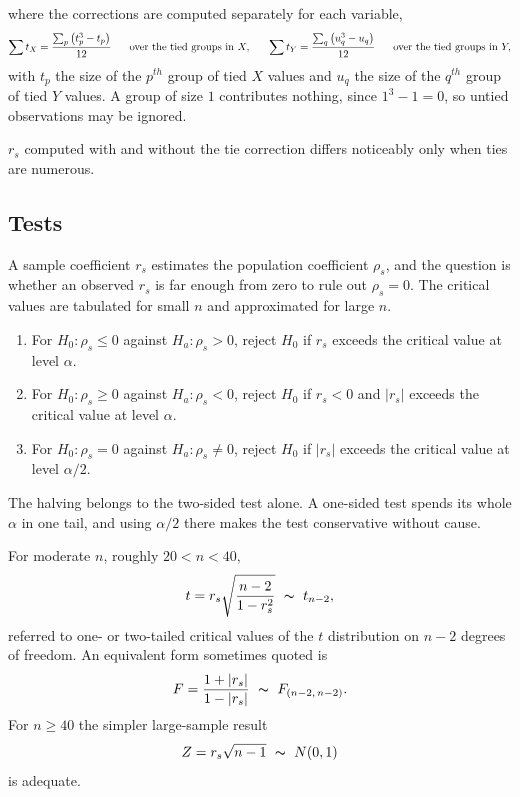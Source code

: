 \documentclass[11pt,a4paper]{article}
\theoremstyle{definition}
\begin{document}
where the corrections are computed separately for each variable,
$$\sum t_X=\dfrac{\sum_{p}\left(t_p^{3}-t_p\right)}{12}
\hspace{0.6cm}\text{over the tied groups in } X,
\hspace{0.6cm}
\sum t_Y=\dfrac{\sum_{q}\left(u_q^{3}-u_q\right)}{12}
\hspace{0.6cm}\text{over the tied groups in } Y,$$
with $t_p$ the size of the $p^{th}$ group of tied $X$ values and $u_q$ the size of
the $q^{th}$ group of tied $Y$ values. A group of size $1$ contributes nothing,
since $1^{3}-1=0$, so untied observations may be ignored.

$r_s$ computed with and without the tie correction differs noticeably only when
ties are numerous.


\subsection{Tests}
A sample coefficient $r_s$ estimates the population coefficient $\rho_s$, and the
question is whether an observed $r_s$ is far enough from zero to rule out
$\rho_s=0$. The critical values are tabulated for small $n$ and approximated for
large $n$.

\begin{enumerate}
\item[(i).] For $H_0:\rho_s\leq 0$ against $H_a:\rho_s>0$, reject $H_0$ if
$r_s$ exceeds the critical value at level $\alpha$.
\item[(ii).] For $H_0:\rho_s\geq 0$ against $H_a:\rho_s<0$, reject $H_0$ if
$r_s<0$ and $\left|r_s\right|$ exceeds the critical value at level $\alpha$.
\item[(iii).] For $H_0:\rho_s=0$ against $H_a:\rho_s\neq 0$, reject $H_0$ if
$\left|r_s\right|$ exceeds the critical value at level $\alpha/2$.
\end{enumerate}

The halving belongs to the two-sided test alone. A one-sided test spends its whole
$\alpha$ in one tail, and using $\alpha/2$ there makes the test conservative
without cause.

For moderate $n$, roughly $20<n<40$,
$$t=r_s\sqrt{\dfrac{n-2}{1-r_s^{2}}}\ \thicksim\ t_{n-2},$$
referred to one- or two-tailed critical values of the $t$ distribution on $n-2$
degrees of freedom. An equivalent form sometimes quoted is
$$F=\dfrac{1+\left|r_s\right|}{1-\left|r_s\right|}\ \thicksim\ F_{(n-2,\,n-2)} .$$
For $n\geq 40$ the simpler large-sample result
$$Z=r_s\sqrt{n-1}\ \thicksim\ N(0,1)$$
is adequate.
\end{document}
